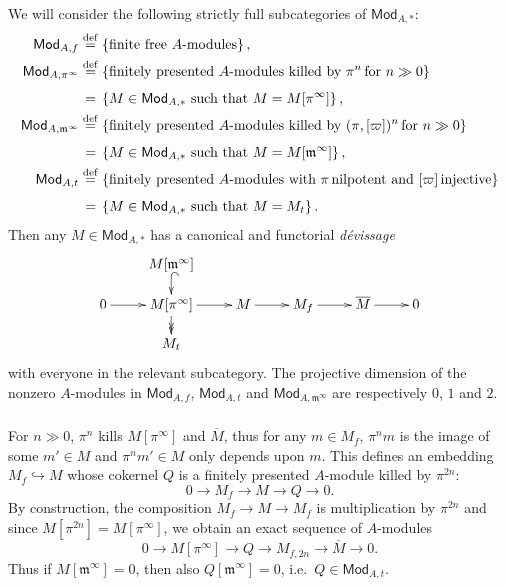 \documentclass[11pt]{article}
\theoremstyle{definition}
\numberwithin{equation}{section}
\numberwithin{figure}{section}
\numberwithin{table}{section}
\newcommand{\Mod}{\mathsf{Mod}}
\newcommand{\eqd}{\stackrel{\mathrm{def}}{=}}
\newcommand{\pheqd}{\stackrel{\phantom{\mathrm{def}}}{=}}
\begin{document}
\subsubsection{}\label{subsec:DevissageOfModules}

We will consider the following strictly full subcategories of $\Mod_{A,\ast}$:
\begin{align*}
\Mod_{A,f} & \eqd \left\{ \text{finite free \ensuremath{A}-modules}\right\},\\
\Mod_{A,\pi^{\infty}} & \eqd \left\{ \text{finitely presented \ensuremath{A}-modules killed by \ensuremath{\pi^{n}\,}for \ensuremath{n\gg0}}\right\} \\
& \pheqd \left\{ M\in\Mod_{A,\ast}\text{ such that }M=M[\pi^{\infty}]\right\},\\
\Mod_{A,\mathfrak{m}^{\infty}} & \eqd \left\{ \text{finitely presented \ensuremath{A}-modules killed by \ensuremath{(\pi,[\varpi])^{n}\,}for \ensuremath{n\gg0}}\right\} \\
&\pheqd\left\{M\in\Mod_{A,\ast}\text{ such that }M=M[\mathfrak{m}^{\infty}]\right\},\\
\Mod_{A,t} & \eqd \left\{ \text{finitely presented \ensuremath{A}-modules with \ensuremath{\pi\,}nilpotent and \ensuremath{[\varpi]\,}injective}\right\} \\
& \pheqd \left\{ M\in\Mod_{A,\ast}\text{ such that \ensuremath{M=M_{t}}}\right\}.
\end{align*}
Then any $M\in\Mod_{A,\ast}$ has a canonical and functorial \emph{d\'evissage
\[
\xymatrix@R=1pc{ & M[\mathfrak{m}^{\infty}]\ar@{^{(}->}[d]\\
0\ar[r] & M[\pi^{\infty}]\ar[r]\ar@{->>}[d] & M\ar[r] & M_{f}\ar[r] & \overline{M}\ar[r] & 0\\
& M_{t} }
\]
}with everyone in the relevant subcategory. The projective dimension of the nonzero $A$-modules in $\Mod_{A,f}$, $\Mod_{A,t}$ and $\Mod_{A,\mathfrak{m}^{\infty}}$ are respectively $0$, $1$ and $2$.

\subsubsection{}\label{subsec:noncanseq}

For $n\gg0$, $\pi^{n}$ kills $M[\pi^{\infty}]$ and $\overline{M}$, thus for any $m\in M_{f}$, $\pi^{n}m$ is the image of some $m'\in M$ and $\pi^{n}m'\in M$ only depends upon $m$. This defines an embedding $M_{f}\hookrightarrow M$ whose cokernel $Q$ is a finitely presented $A$-module killed by $\pi^{2n}$:
\[
0\rightarrow M_{f}\rightarrow M\rightarrow Q\rightarrow0.
\]
By construction, the composition $M_{f}\rightarrow M\rightarrow M_{f}$ is multiplication by $\pi^{2n}$ and since $M[\pi^{2n}]=M[\pi^{\infty}]$, we obtain an exact sequence of $A$-modules
\[
0\rightarrow M[\pi^{\infty}]\rightarrow Q\rightarrow M_{f,2n}\rightarrow\overline{M}\rightarrow0.
\]
Thus if $M[\mathfrak{m}^{\infty}]=0$, then also $Q[\mathfrak{m}^{\infty}]=0$, i.e.~$Q\in\Mod_{A,t}$.
\end{document}
